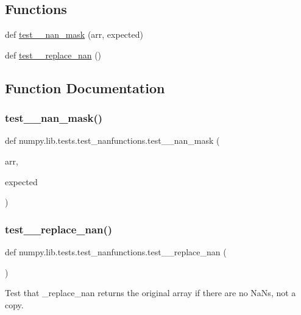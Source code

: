 \subsection*{Functions}
\begin{DoxyCompactItemize}
\item 
def \hyperlink{namespacenumpy_1_1lib_1_1tests_1_1test__nanfunctions_abaede76c33a7a87f7a45e6281da8ac3b}{test\+\_\+\+\_\+nan\+\_\+mask} (arr, expected)
\item 
def \hyperlink{namespacenumpy_1_1lib_1_1tests_1_1test__nanfunctions_a3b02cafdfa4531b09031a64ba1ceb9be}{test\+\_\+\+\_\+replace\+\_\+nan} ()
\end{DoxyCompactItemize}


\subsection{Function Documentation}
\mbox{\label{namespacenumpy_1_1lib_1_1tests_1_1test__nanfunctions_abaede76c33a7a87f7a45e6281da8ac3b}} 
\subsubsection{\texorpdfstring{test\+\_\+\+\_\+nan\+\_\+mask()}{test\_\_nan\_mask()}}
{\footnotesize\ttfamily def numpy.\+lib.\+tests.\+test\+\_\+nanfunctions.\+test\+\_\+\+\_\+nan\+\_\+mask (\begin{DoxyParamCaption}\item[{}]{arr,  }\item[{}]{expected }\end{DoxyParamCaption})}

\mbox{\label{namespacenumpy_1_1lib_1_1tests_1_1test__nanfunctions_a3b02cafdfa4531b09031a64ba1ceb9be}} 
\subsubsection{\texorpdfstring{test\+\_\+\+\_\+replace\+\_\+nan()}{test\_\_replace\_nan()}}
{\footnotesize\ttfamily def numpy.\+lib.\+tests.\+test\+\_\+nanfunctions.\+test\+\_\+\+\_\+replace\+\_\+nan (\begin{DoxyParamCaption}{ }\end{DoxyParamCaption})}

\begin{DoxyVerb}Test that _replace_nan returns the original array if there are no
NaNs, not a copy.
\end{DoxyVerb}
 